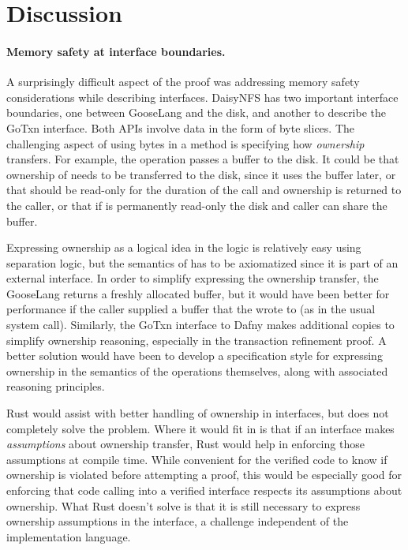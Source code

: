\section{Discussion}

\paragraph{Memory safety at interface boundaries.}
A surprisingly difficult aspect of the proof was addressing memory safety
considerations while describing interfaces.
DaisyNFS has two important interface boundaries, one between GooseLang and the
disk, and another to describe the GoTxn interface. Both APIs involve data in the
form of byte slices. The challenging aspect of using bytes in a method is
specifying how \emph{ownership} transfers. For example, the 
operation passes a buffer  to the disk. It could be that ownership of
 needs to be transferred to the disk, since it uses the buffer later, or
that  should be read-only for the duration of the call and ownership is
returned to the caller, or that if  is permanently read-only the disk and
caller can share the buffer.

Expressing ownership as a logical idea in the logic is relatively easy using
separation logic, but the semantics of  has to be
axiomatized since it is part of an external interface. In order to simplify expressing the ownership transfer, the
GooseLang  returns a freshly allocated buffer, but it would have
been better for performance if the caller supplied a buffer that the
 wrote to (as in the usual  system call). Similarly, the
GoTxn interface to Dafny makes additional copies to simplify ownership
reasoning, especially in the transaction refinement proof. A better solution would
have been to develop a specification style for expressing ownership in the
semantics of the operations themselves, along with associated reasoning
principles.

Rust would assist with better handling of ownership in interfaces, but does
not completely solve the problem. Where it would fit in is that if an interface
makes \emph{assumptions} about ownership transfer, Rust would help in enforcing
those assumptions at compile time. While convenient for the verified code to
know if ownership is violated before attempting a proof, this would be
especially good for enforcing that code calling into a verified interface
respects its assumptions about ownership. What Rust doesn't solve is that it is
still necessary to express ownership assumptions in the interface, a challenge
independent of the implementation language.

